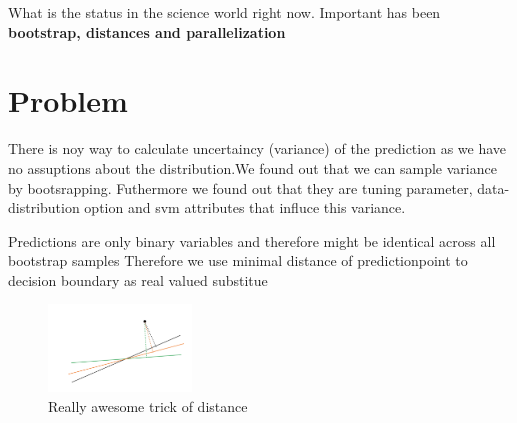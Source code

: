 \documentclass[letterpaper]{article}
\begin{document}
What is the status in the science world right now.
Important has been \textbf{bootstrap, distances and parallelization}

\section{Problem}

There is noy way to calculate uncertaincy (variance) of the prediction as we have no assuptions about the distribution.We found out that we can sample variance by bootsrapping.
Futhermore we found out that they are tuning parameter, data-distribution option and svm attributes that influce this variance.

Predictions are only binary variables and therefore might be identical across all bootstrap samples Therefore we use minimal distance of predictionpoint to decision boundary as real valued substitue 



\begin{figure}[!htb]
\begin{center}
\includegraphics[width=1.5in]{abb/distances.jpg}
\caption{Really awesome trick of distance}
\label{fig1}
\end{center}
\end{figure}
\end{document}
